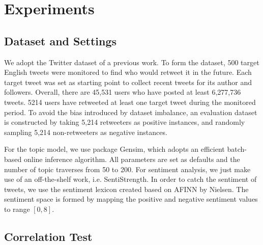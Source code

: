 \documentclass[letterpaper]{article}
\begin{document}
\section{Experiments}
\label{experiments}

\subsection{Dataset and Settings}
We adopt the Twitter dataset of a previous work\cite{Luo:2013RMF}. 
To form the dataset, 500 target English tweets were monitored to find who would retweet it in the future. 
Each target tweet was set as starting point to collect recent tweets for its author and followers.
Overall, there are 45,531 users who have posted at least 6,277,736 tweets. 5214 users have retweeted at least one target tweet during the monitored period. To avoid the bias introduced by dataset imbalance, an evaluation dataset is constructed by taking 5,214 retweeters as positive instances, and randomly sampling 5,214 non-retweeters as negative instances. 

For the topic model, we use package Gensim\cite{rehurek_lrec}, which adopts an efficient batch-based online inference algorithm. All parameters are set as defaults and the number of topic traverses from 50 to 200. For sentiment analysis, we just make use of an off-the-shelf work, i.e. SentiStrength\cite{thelwall2010sentiment}. In order to catch the sentiment of tweets, we use the sentiment lexicon created based on AFINN by Nielsen\cite{MohammadKZ2013}. The sentiment space is formed by mapping the positive and negative sentiment values to range $ [0,8] $.

\subsection{Correlation Test}
\end{document}
